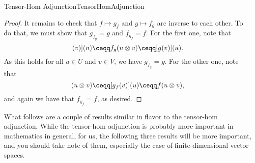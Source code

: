\begin{thm}{Tensor-Hom Adjunction}{TensorHomAdjunction}
\begin{proof}
		It remains to check that $f\mapsto g_f$ and $g\mapsto f_g$ are inverse to each other.  To do that, we must show that $g_{f_g}=g$ and $f_{g_f}=f$.  For the first one, note that
		\begin{equation}
			[[g_{f_g}](v)](u)\ceqq f_g(u\otimes v)\ceqq [g(v)](u).
		\end{equation}
		As this holds for all $u\in U$ and $v\in V$, we have $g_{f_g}=g$.  For the other one, note that
		\begin{equation}
			[f_{g_f}](u\otimes v)\ceqq [g_f(v)](u)\ceqq f(u\otimes v),
		\end{equation}
		and again we have that $f_{g_f}=f$, as desired.
	\end{proof}
\end{thm}
What follows are a couple of results similar in flavor to the tensor-hom adjunction.  While the tensor-hom adjunction is probably more important in mathematics in general, for us, the following three results will be more important, and you should take note of them, especially the case of finite-dimensional vector spaces.
